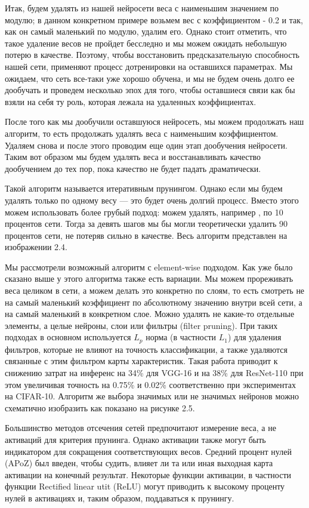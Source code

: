 \documentclass[oneside,final,12pt]{extreport}
\begin{document}
Итак, будем удалять из нашей нейросети веса с наименьшим значением по модулю; в данном конкретном примере возьмем вес с коэффициентом - 0.2 и так, как он самый маленький по модулю, удалим его. Однако стоит отметить, что такое удаление весов не пройдет бесследно и мы можем ожидать небольшую потерю в качестве.  Поэтому, чтобы восстановить предсказательную способность нашей сети, применяют процесс дотренировки на оставшихся параметрах. Мы ожидаем, что сеть все-таки уже хорошо обучена, и мы не будем очень долго ее дообучать и проведем несколько эпох для того, чтобы оставшиеся связи как бы взяли на себя ту роль, которая лежала на удаленных коэффициентах.

После того как мы дообучили оставшуюся нейросеть, мы можем продолжать наш алгоритм, то есть продолжать удалять веса с наименьшим коэффициентом. Удаляем снова и после этого проводим еще один этап дообучения нейросети. Таким вот образом мы будем удалять веса и восстанавливать качество дообучением до тех пор, пока качество не будет падать драматически. 

Такой алгоритм называется итеративным прунингом. Однако если мы будем удалять только по одному весу — это будет очень долгий процесс. Вместо этого можем использовать более грубый подход: можем удалять, например , по 10 процентов сети. Тогда за девять шагов мы бы могли теоретически удалить 90 процентов сети, не потеряв сильно в качестве. Весь алгоритм представлен на изображении 2.4.

Мы рассмотрели возможный алгоритм с element-wise подходом. Как уже было сказано выше у этого алгоритма также есть вариации. Мы можем прореживать веса целиком в сети, а можем делать это конкретно по слоям, то есть смотреть не на самый маленький коэффициент по абсолютному значению внутри всей сети, а на самый маленький в конкретном слое. Можно удалять не какие-то отдельные элементы, а целые нейроны, слои или фильтры (filter pruning). При таких подходах в основном используется $L_p$ норма (в частности $L_1$) для удаления фильтров, которые не влияют на точность классификации, а также удаляются связанные с этим фильтром карты характеристик.  Такая работа приводит к снижению затрат на инференс на 34\% для VGG-16 и на 38\% для ResNet-110 при этом увеличивая точность на 0.75\% и 0.02\% соответственно при экспериментах на CIFAR-10. Алгоритм же выбора значимых или не значимых нейронов можно схематично изобразить как показано на рисунке 2.5.

Большинство методов отсечения сетей предпочитают измерение веса, а не активаций для критерия прунинга. Однако активации также могут быть индикатором для сокращения соответствующих весов. Средний процент нулей (APoZ)  был введен, чтобы судить, влияет ли та или иная выходная карта активации на конечный результат. Некоторые функции активации, в частности функции Rectified linear utit (ReLU) могут приводить к высокому проценту нулей в активациях и, таким образом, поддаваться к прунингу. 
\end{document}
